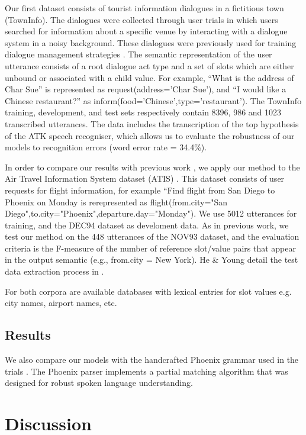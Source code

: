 \documentclass[11pt]{article}
\begin{document}
Our first dataset consists of tourist information dialogues in a fictitious
town (TownInfo). The dialogues were collected through user
trials in which users searched for information about a specific venue
by interacting with a dialogue system in a noisy background. These
dialogues were previously used for training dialogue management
strategies \cite{williams07,thomson08}. The semantic representation of the user utterance consists of a root dialogue act type and a set of slots which are either
unbound or associated with a child value. For example, ``What is
the address of Char Sue'' is represented as request(address='Char Sue'), and ``I would like a Chinese restaurant?'' as inform(food='Chinese',type='restaurant'). The TownInfo training, development, and test sets respectively contain
8396, 986 and 1023 transcribed utterances.  The data includes the transcription of the top hypothesis of the ATK speech recogniser,
which allows us to evaluate the robustness of our models to recognition
errors (word error rate = 34.4\%). 

In order to compare our results with previous work \cite{he06,zettlemoyer07},
we apply our method to the Air Travel Information System dataset
(ATIS) \cite{atis94}. This dataset consists of user requests for flight information, for example ``Find flight from San Diego to Phoenix on Monday is rerepresented as flight(from.city="San Diego",to.city="Phoenix",departure.day="Monday"). We use 5012 utterances for training, and the DEC94 dataset as develoment data. As in previous work, we test our method on the 448 utterances of the NOV93 dataset, and the evaluation criteria is the F-measure of the number of reference slot/value pairs that appear in the output semantic (e.g., from.city = New York). He \& Young detail the test data extraction process in \cite{he05}.

For both corpora are available databases with lexical entries for slot values e.g. city names, airport names, etc. 

\subsection{Results}

We also compare our models with the handcrafted Phoenix grammar \cite{ward91} used in the trials \cite{williams07,thomson08}. The Phoenix parser implements a partial matching algorithm that was designed for robust spoken language understanding.

\section{Discussion}
\end{document}
